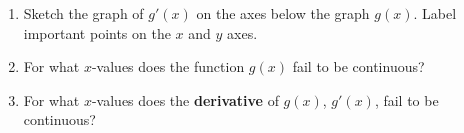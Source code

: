 \documentclass[12pt]{article}
\begin{document}
\begin{enumerate}
\begin{center}
\end{center}

\vfill

\begin{enumerate}
\item Sketch the graph of $g'(x)$ on the axes below the graph $g(x).$ Label important points on the $x$ and $y$ axes.
\vspace{.4in}
\item For what $x$-values does the function $g(x)$ fail to be continuous?
\vfill
\item For what $x$-values does the \textbf{derivative} of $g(x)$, $g'(x)$, fail to be continuous?
\vfill
\end{enumerate}
\vspace{0.3in}


\end{enumerate}
\end{document}
